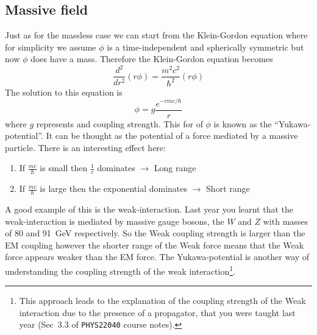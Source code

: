 \subsection{Massive field}
\label{sec:massive_field}
Just as for the massless case we can start from the Klein-Gordon equation where for simplicity we assume $\phi$ is a time-independent and spherically symmetric but now $\phi$ does have a mass. Therefore the Klein-Gordon equation becomes
\[
\frac{d^2}{dr^2}(r\phi)=\frac{m^2c^2}{\hbar^2}(r\phi)
\]
The solution to this equation is
\[
\phi=g\frac{e^{-rmc/\hbar}}{r}
\]
where $g$ represents and coupling strength. This for of $\phi$ is known as the ``Yukawa-potential''. It can be thought as the potential of a force mediated by a massive particle. There is an interesting effect here:
\begin{enumerate}
\item If $\frac{mc}{\hbar}$ is small then $\frac{1}{r}$ dominates $\to$ Long range
\item If $\frac{mc}{\hbar}$ is large then the exponential dominates $\to$ Short range
\end{enumerate}
A good example of this is the weak-interaction. Last year you learnt that the weak-interaction is mediated by massive gauge bosons, the $W$ and $Z$ with masses of 80 and 91~GeV respectively. %
So the Weak coupling strength is larger than the EM coupling however the shorter range of the Weak force means that the Weak force appears weaker than the EM force. The Yukawa-potential is another way of understanding the coupling strength of the weak interaction\footnote{This approach leads to the explanation of the coupling strength of the Weak interaction due to the presence of a propagator, that you were taught last year (Sec~3.3 of \texttt{PHYS22040} course notes).}.


